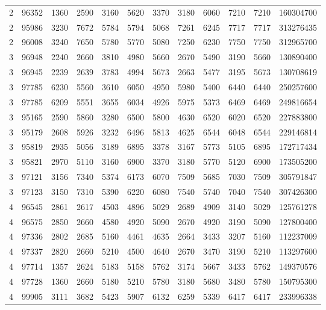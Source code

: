 \documentclass[journal]{IEEEtran}
\begin{document}
\begin{table}
\begin{tabular}{|cc|cccccccc|cc|}
2	&	96352	&	1360	&	2590	&	3160	&	5620	&	3370	&	3180	&	6060	&	7210	&	7210	&	160304700	\\
2	&	95986	&	3230	&	7672	&	5784	&	5794	&	5068	&	7261	&	6245	&	7717	&	7717	&	313276435	\\
2	&	96008	&	3240	&	7650	&	5780	&	5770	&	5080	&	7250	&	6230	&	7750	&	7750	&	312965700	\\
\hline																							
3	&	96948	&	2240	&	2660	&	3810	&	4980	&	5660	&	2670	&	5490	&	3190	&	5660	&	130890400	\\
3	&	96945	&	2239	&	2639	&	3783	&	4994	&	5673	&	2663	&	5477	&	3195	&	5673	&	130708619	\\
3	&	97785	&	6230	&	5560	&	3610	&	6050	&	4950	&	5980	&	5400	&	6440	&	6440	&	250257600	\\
3	&	97785	&	6209	&	5551	&	3655	&	6034	&	4926	&	5975	&	5373	&	6469	&	6469	&	249816654	\\
3	&	95165	&	2590	&	5860	&	3280	&	6500	&	5800	&	4630	&	6520	&	6020	&	6520	&	227883800	\\
3	&	95179	&	2608	&	5926	&	3232	&	6496	&	5813	&	4625	&	6544	&	6048	&	6544	&	229146814	\\
3	&	95819	&	2935	&	5056	&	3189	&	6895	&	3378	&	3167	&	5773	&	5105	&	6895	&	172717434	\\
3	&	95821	&	2970	&	5110	&	3160	&	6900	&	3370	&	3180	&	5770	&	5120	&	6900	&	173505200	\\
3	&	97121	&	3156	&	7340	&	5374	&	6173	&	6070	&	7509	&	5685	&	7030	&	7509	&	305791847	\\
3	&	97123	&	3150	&	7310	&	5390	&	6220	&	6080	&	7540	&	5740	&	7040	&	7540	&	307426300	\\
\hline																							
4	&	96545	&	2861	&	2617	&	4503	&	4896	&	5029	&	2689	&	4909	&	3140	&	5029	&	125761278	\\
4	&	96575	&	2850	&	2660	&	4580	&	4920	&	5090	&	2670	&	4920	&	3190	&	5090	&	127800400	\\
4	&	97336	&	2802	&	2685	&	5160	&	4461	&	4635	&	2664	&	3433	&	3207	&	5160	&	112237009	\\
4	&	97337	&	2820	&	2660	&	5210	&	4500	&	4640	&	2670	&	3470	&	3190	&	5210	&	113297600	\\
4	&	97714	&	1357	&	2624	&	5183	&	5158	&	5762	&	3174	&	5667	&	3433	&	5762	&	149370576	\\
4	&	97728	&	1360	&	2660	&	5180	&	5210	&	5780	&	3180	&	5680	&	3480	&	5780	&	150795300	\\
4	&	99905	&	3111	&	3682	&	5423	&	5907	&	6132	&	6259	&	5339	&	6417	&	6417	&	233996338	\\

\end{tabular}
\end{table}
\end{document}
